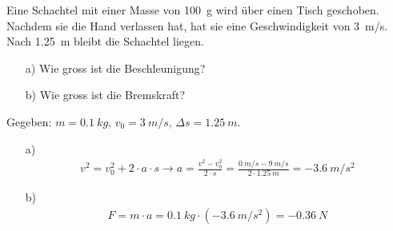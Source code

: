 
\begin{aufgabe}
	\label{SchachtelBeschleunigungKraft}
Eine Schachtel mit einer Masse von \SI{100}{g} wird über einen Tisch geschoben.
Nachdem sie die Hand verlassen hat, hat sie eine Geschwindigkeit von \SI{3}{m/s}.
Nach \SI{1.25}{m} bleibt die Schachtel liegen.
\begin{itemize}
\item[a)] Wie gross ist die Beschleunigung?
\item[b)] Wie gross ist die Bremskraft?
\end{itemize}
	
	\begin{loesung}
		Gegeben: $m=\SI{0.1}{kg}$, $v_0=\SI{3}{m/s}$, $\Delta s=\SI{1.25}{m}$. 
		\begin{itemize}
\item[a)] 
	\begin{eqnarray*}
		v^2=v_0^2 + 2\cdot a\cdot s \to a=\frac{v^2-v_0^2}{2\cdot s}=\frac{\SI{0}{m/s}-\SI{9}{m/s}}{2\cdot\SI{1.25}{m}}=\SI{-3.6}{m/s^2}
	\end{eqnarray*}
\item[b)]  
	\begin{eqnarray*}
		F=m\cdot a=\SI{0.1}{kg}\cdot(-\SI{3.6}{m/s^2})=\SI{-0.36}{N}
	\end{eqnarray*}
\end{itemize}
	\end{loesung}
\end{aufgabe}

